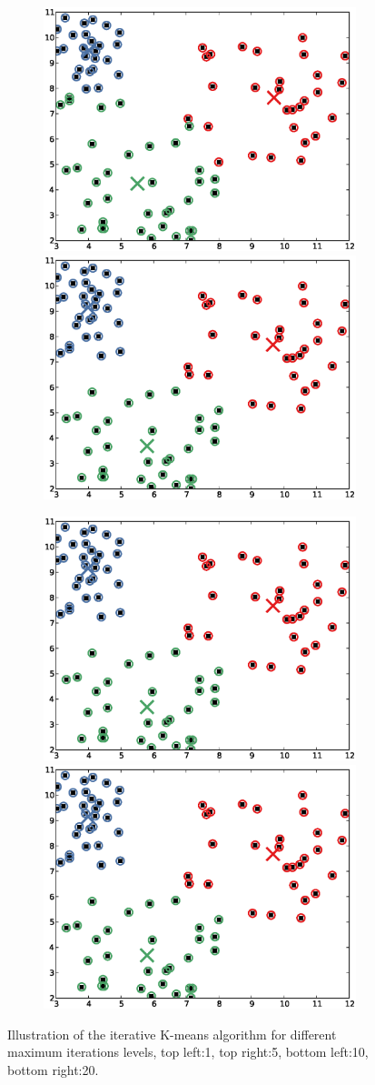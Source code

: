 \documentclass[a4paper,10pt]{article}
\begin{document}
\begin{figure}
  \begin{subfigure}{1.0\textwidth}
    \centering
    \includegraphics[width=.49\textwidth,height=.3\textheight,keepaspectratio]{figure_1_1.eps}
    \includegraphics[width=.49\textwidth,height=.3\textheight,keepaspectratio]{figure_1_2.eps}
  \end{subfigure}
  \begin{subfigure}{1.0\textwidth}
    \centering
    \includegraphics[width=.49\textwidth,height=.3\textheight,keepaspectratio]{figure_1_3.eps}
    \includegraphics[width=.49\textwidth,height=.3\textheight,keepaspectratio]{figure_1_4.eps}
  \end{subfigure}

  \caption{Illustration of the iterative K-means algorithm for different maximum iterations levels, top left:1, top right:5, bottom left:10, bottom right:20.}
  \label{fig:kmeansiter}
\end{figure}
\end{document}
